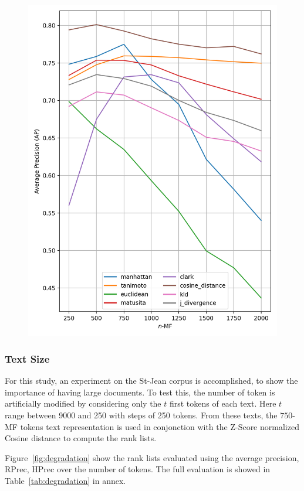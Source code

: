 \begin{figure}
  \label{fig:lemmas}
  \includegraphics[width=0.9\linewidth]{img/mf_lemmas.png}
\end{figure}

\subsubsection{Text Size\label{sec:importance_of_text_size}}

For this study, an experiment on the St-Jean corpus is accomplished, to show the importance of having large documents.
To test this, the number of token is artificially modified by considering only the $t$ first tokens of each text.
Here $t$ range between 9000 and 250 with steps of 250 tokens.
From these texts, the $750$-MF tokens text representation is used in conjonction with the Z-Score normalized Cosine distance to compute the rank lists.

Figure~\ref{fig:degradation} show the rank lists evaluated using the average precision, RPrec, HPrec over the number of tokens.
The full evaluation is showed in Table~\ref{tab:degradation} in annex.

